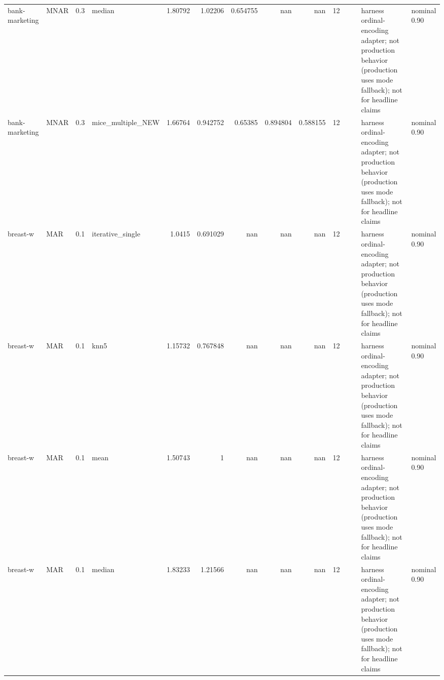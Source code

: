 \begin{table}[ht]
\begin{tabular}{llrlrrrrrrllll}
 bank-marketing       & MNAR        &         0.3 & median            &       1.80792  &             1.02206  &                 0.654755 &                     nan        &                       nan        &        12 &                    &                                         & harness ordinal-encoding adapter; not production behavior (production uses mode fallback); not for headline claims & nominal 0.90              \\
 bank-marketing       & MNAR        &         0.3 & mice\_multiple\_NEW &       1.66764  &             0.942752 &                 0.65385  &                       0.894804 &                         0.588155 &        12 &                    &                                         & harness ordinal-encoding adapter; not production behavior (production uses mode fallback); not for headline claims & nominal 0.90              \\
 breast-w             & MAR         &         0.1 & iterative\_single  &       1.0415   &             0.691029 &               nan        &                     nan        &                       nan        &        12 &                    &                                         & harness ordinal-encoding adapter; not production behavior (production uses mode fallback); not for headline claims & nominal 0.90              \\
 breast-w             & MAR         &         0.1 & knn5              &       1.15732  &             0.767848 &               nan        &                     nan        &                       nan        &        12 &                    &                                         & harness ordinal-encoding adapter; not production behavior (production uses mode fallback); not for headline claims & nominal 0.90              \\
 breast-w             & MAR         &         0.1 & mean              &       1.50743  &             1        &               nan        &                     nan        &                       nan        &        12 &                    &                                         & harness ordinal-encoding adapter; not production behavior (production uses mode fallback); not for headline claims & nominal 0.90              \\
 breast-w             & MAR         &         0.1 & median            &       1.83233  &             1.21566  &               nan        &                     nan        &                       nan        &        12 &                    &                                         & harness ordinal-encoding adapter; not production behavior (production uses mode fallback); not for headline claims & nominal 0.90              \\

\end{tabular}
\end{table}
